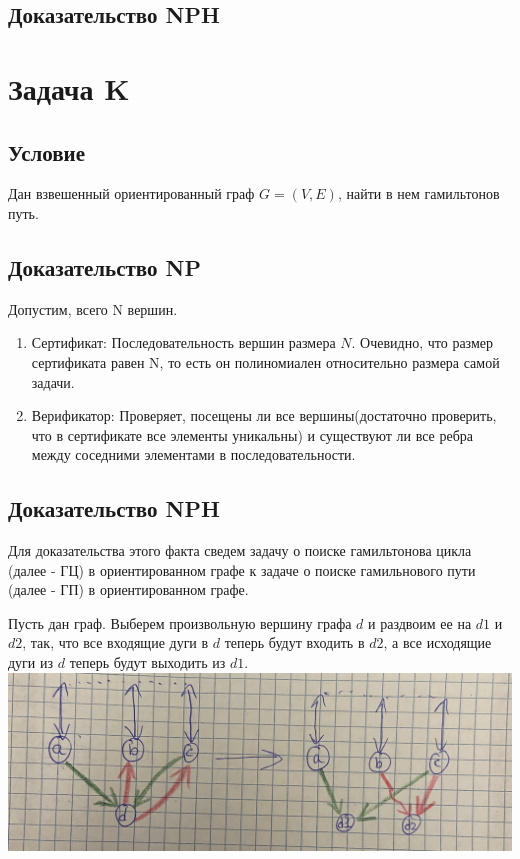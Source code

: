 \documentclass{article}
\begin{document}
\subsection*{Доказательство NPH}


\newpage
\section*{Задача K} 
\subsection*{Условие} 
Дан взвешенный ориентированный граф $G = (V, E)$, найти в нем гамильтонов путь.

\subsection*{Доказательство NP}
Допустим, всего N вершин.
\begin{enumerate}
\item Сертификат: Последовательность вершин размера $N$. Очевидно, что размер сертификата равен N, то есть он полиномиален относительно размера самой задачи.
\item Верификатор: Проверяет, посещены ли все вершины(достаточно проверить, что в сертификате все элементы уникальны) и существуют ли все ребра между соседними элементами в последовательности.
\end{enumerate}

\subsection*{Доказательство NPH}
Для доказательства этого факта сведем задачу о поиске гамильтонова цикла (далее - ГЦ) в ориентированном графе к задаче о поиске гамильнового пути (далее - ГП) в ориентированном графе.

Пусть дан граф. Выберем произвольную вершину графа $d$ и раздвоим ее на $d1$ и $d2$, так, что все входящие дуги в $d$ теперь будут входить в $d2$, а все исходящие дуги из $d$ теперь будут выходить из $d1$. \\

\includegraphics[totalheight=4cm]{IMG_0864.jpg}
\end{document}
